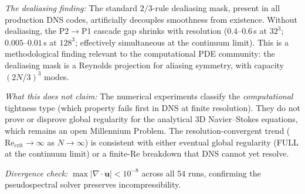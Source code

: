 \documentclass[11pt,a4paper]{article}
\begin{document}
\emph{The dealiasing finding:} The standard $2/3$-rule dealiasing mask, present in all production DNS codes, artificially decouples smoothness from existence.  Without dealiasing, the P2$\to$P1 cascade gap shrinks with resolution ($0.4$--$0.6$\,s at $32^3$; $0.005$--$0.01$\,s at $128^3$; effectively simultaneous at the continuum limit).  This is a methodological finding relevant to the computational PDE community: the dealiasing mask is a Reynolds projection for aliasing symmetry, with capacity $(2N/3)^3$ modes.

\emph{What this does not claim:} The numerical experiments classify the \emph{computational} tightness type (which property fails first in DNS at finite resolution).  They do not prove or disprove global regularity for the analytical 3D Navier--Stokes equations, which remains an open Millennium Problem.  The resolution-convergent trend ($\mathrm{Re}_{\mathrm{crit}} \to \infty$ as $N \to \infty$) is consistent with either eventual global regularity (FULL at the continuum limit) or a finite-Re breakdown that DNS cannot yet resolve.

\emph{Divergence check:} $\max|\nabla \cdot \mathbf{u}| < 10^{-8}$ across all 54 runs, confirming the pseudospectral solver preserves incompressibility.
\end{document}
